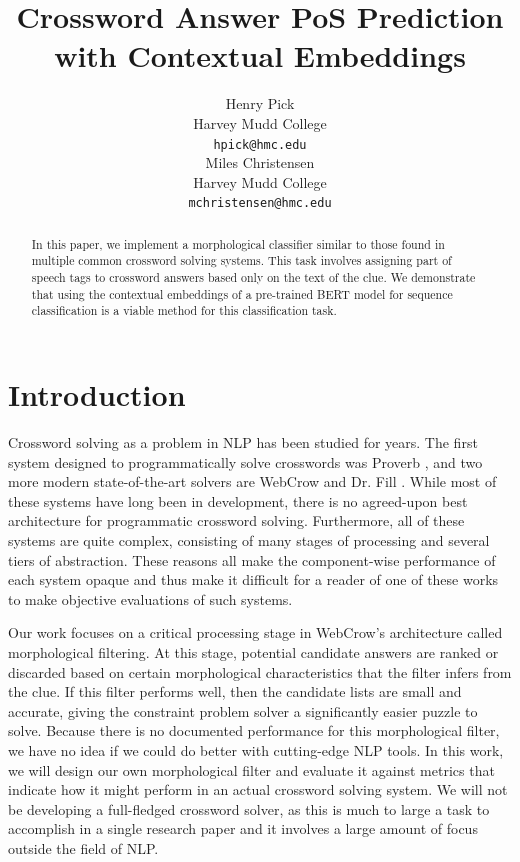 \documentclass[11pt]{article}
\title{Crossword Answer PoS Prediction with Contextual Embeddings}
\author{
  Henry Pick \\
  Harvey Mudd College \\
  \texttt{hpick@hmc.edu} \\\And
  Miles Christensen \\
  Harvey Mudd College \\
  \texttt{mchristensen@hmc.edu}
 }
\begin{document}
\maketitle

\begin{abstract}
    In this paper, we implement a morphological classifier similar to those found in multiple common crossword solving systems. This task involves assigning part of speech tags to crossword answers based only on the text of the clue. We demonstrate that using the contextual embeddings of a pre-trained BERT model for sequence classification is a viable method for this classification task.
\end{abstract}

\section{Introduction}
Crossword solving as a problem in NLP has been studied for years. The first system designed to programmatically solve crosswords was Proverb \cite{Keim99-PROVERB, Littman02-AProbabilistic}, and two more modern state-of-the-art solvers are WebCrow \cite{Angelini05-Webcrow} and Dr. Fill \cite{Ginsberg11-DrFill}. While most of these systems have long been in development, there is no agreed-upon best architecture for programmatic crossword solving. Furthermore, all of these systems are quite complex, consisting of many stages of processing and several tiers of abstraction. These reasons all make the component-wise performance of each system opaque and thus make it difficult for a reader of one of these works to make objective evaluations of such systems.

Our work focuses on a critical processing stage in WebCrow's architecture called morphological filtering. At this stage, potential candidate answers are ranked or discarded based on certain morphological characteristics that the filter infers from the clue. If this filter performs well, then the candidate lists are small and accurate, giving the constraint problem solver a significantly easier puzzle to solve. Because there is no documented performance for this morphological filter, we have no idea if we could do better with cutting-edge NLP tools. In this work, we will design our own morphological filter and evaluate it against metrics that indicate how it might perform in an actual crossword solving system. We will not be developing a full-fledged crossword solver, as this is much to large a task to accomplish in a single research paper and it involves a large amount of focus outside the field of NLP.
\end{document}
